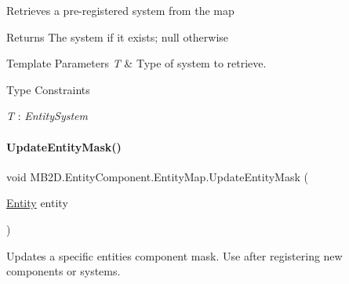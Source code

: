 Retrieves a pre-\/registered system from the map 

\begin{DoxyReturn}{Returns}
The system if it exists; null otherwise
\end{DoxyReturn}

\begin{DoxyTemplParams}{Template Parameters}
{\em T} & Type of system to retrieve.\\
\hline
\end{DoxyTemplParams}
\begin{Desc}
\item[Type Constraints]\begin{description}
\item[{\em T} : {\em Entity\+System}]\end{description}
\end{Desc}
\hypertarget{class_m_b2_d_1_1_entity_component_1_1_entity_map_a968ce46cbba14cdc7814dd308f133949}{}\label{class_m_b2_d_1_1_entity_component_1_1_entity_map_a968ce46cbba14cdc7814dd308f133949} 
\paragraph{\texorpdfstring{Update\+Entity\+Mask()}{UpdateEntityMask()}}
{\footnotesize\ttfamily void M\+B2\+D.\+Entity\+Component.\+Entity\+Map.\+Update\+Entity\+Mask (\begin{DoxyParamCaption}\item[{\hyperlink{class_m_b2_d_1_1_entity_component_1_1_entity}{Entity}}]{entity }\end{DoxyParamCaption})\hspace{0.3cm}{\ttfamily [inline]}}



Updates a specific entities component mask. Use after registering new components or systems. 


